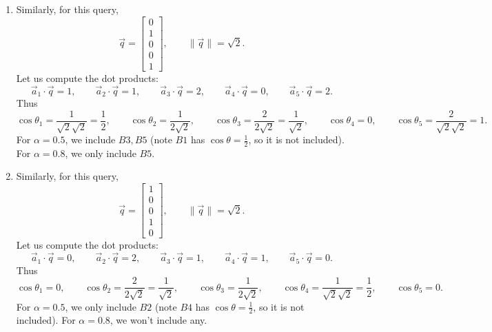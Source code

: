\documentclass[10pt]{extarticle}
\begin{document}
\begin{enumerate}[label=\roman*.]
\begin{align*}
\cos\theta_1&=\frac{2}{\sqrt{2}\sqrt{2}}=1,\\
\cos\theta_2&=\frac{2}{2\sqrt{2}}=\frac{1}{\sqrt{2}},\qquad
\cos\theta_3=\frac{2}{2\sqrt{2}}=\frac{1}{\sqrt{2}},\\
\cos\theta_4&=\frac{1}{\sqrt{2}\sqrt{2}}=\frac{1}{2},\qquad
\cos\theta_5=\frac{1}{\sqrt{2}\sqrt{2}}=\frac{1}{2}.
\end{align*}
For $\alpha=0.5$, we include $B1,B2,B3$ (note $B4$ and $B5$ have $\cos\theta=\frac{1}{2}$, so they are not included since we require $\cos\theta>\alpha$).
For $\alpha=0.8$, we only include $B1$.
\item Similarly, for this query,
\[
\vec{q}=\begin{bmatrix}0\\1\\0\\0\\1\end{bmatrix},\qquad \|\vec{q}\|=\sqrt{2}.
\]
Let us compute the dot products:
\[
\vec{a}_1\cdot\vec{q}=1,\qquad
\vec{a}_2\cdot\vec{q}=1,\qquad
\vec{a}_3\cdot\vec{q}=2,\qquad
\vec{a}_4\cdot\vec{q}=0,\qquad
\vec{a}_5\cdot\vec{q}=2.
\]
Thus
\[
\cos\theta_1=\frac{1}{\sqrt{2}\sqrt{2}}=\frac{1}{2},\qquad
\cos\theta_2=\frac{1}{2\sqrt{2}},\qquad
\cos\theta_3=\frac{2}{2\sqrt{2}}=\frac{1}{\sqrt{2}},\qquad
\cos\theta_4=0,\qquad
\cos\theta_5=\frac{2}{\sqrt{2}\sqrt{2}}=1.
\]
For $\alpha=0.5$, we include $B3,B5$ (note $B1$ has $\cos\theta=\frac{1}{2}$, so it is not included).
For $\alpha=0.8$, we only include $B5$.
\item Similarly, for this query,
\[
\vec{q}=\begin{bmatrix}1\\0\\0\\1\\0\end{bmatrix},\qquad \|\vec{q}\|=\sqrt{2}.
\]
Let us compute the dot products:
\[
\vec{a}_1\cdot\vec{q}=0,\qquad
\vec{a}_2\cdot\vec{q}=2,\qquad
\vec{a}_3\cdot\vec{q}=1,\qquad
\vec{a}_4\cdot\vec{q}=1,\qquad
\vec{a}_5\cdot\vec{q}=0.
\]
Thus
\[
\cos\theta_1=0,\qquad
\cos\theta_2=\frac{2}{2\sqrt{2}}=\frac{1}{\sqrt{2}},\qquad
\cos\theta_3=\frac{1}{2\sqrt{2}},\qquad
\cos\theta_4=\frac{1}{\sqrt{2}\sqrt{2}}=\frac{1}{2},\qquad
\cos\theta_5=0.
\]
For $\alpha=0.5$, we only include $B2$ (note $B4$ has $\cos\theta=\frac{1}{2}$, so it is not included).
For $\alpha=0.8$, we won't include any.
\end{enumerate}
\end{document}
